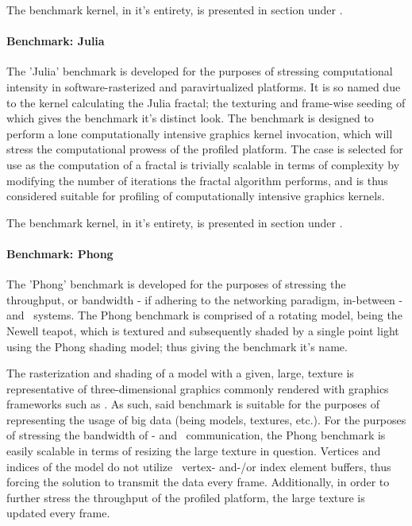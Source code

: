 The benchmark kernel, in it's entirety, is presented in section  under .

\paragraph{Benchmark: Julia}
\label{par:methodologyexperiment_benchmarking_benchmarkjulia}
The 'Julia' benchmark is developed for the purposes of stressing computational intensity in software-rasterized and paravirtualized platforms.
It is so named due to the kernel calculating the Julia fractal; the texturing and frame-wise seeding of which gives the benchmark it's distinct look.
The benchmark is designed to perform a lone computationally intensive graphics kernel invocation, which will stress the computational prowess of the profiled platform.
The case is selected for use as the computation of a fractal is trivially scalable in terms of complexity by modifying the number of iterations the fractal algorithm performs, and is thus considered suitable for profiling of computationally intensive graphics kernels.

The benchmark kernel, in it's entirety, is presented in section
 under .

\paragraph{Benchmark: Phong}
\label{par:methodologyexperiment_benchmarking_benchmarkphong}
The 'Phong' benchmark is developed for the purposes of stressing the throughput, or bandwidth - if adhering to the networking paradigm, in-between \dvttermtarget - and \dvttermhost\ systems.
The Phong benchmark is comprised of a rotating model, being the Newell teapot, which is textured and subsequently shaded by a single point light using the Phong shading model; thus giving the benchmark it's name. %

The rasterization and shading of a model with a given, large, texture is representative of three-dimensional graphics commonly rendered with graphics frameworks such as \dvttermopenglestwopointo .
As such, said benchmark is suitable for the purposes of representing the usage of big data (being models, textures, etc.).
For the purposes of stressing the bandwidth of \dvttermtarget - and \dvttermhost\ communication, the Phong benchmark is easily scalable in terms of resizing the large texture in question.
Vertices and indices of the model do not utilize \dvttermopengl\ vertex- and-/or index element buffers, thus forcing the solution to transmit the data every frame.
Additionally, in order to further stress the throughput of the profiled platform, the large texture is updated every frame.

